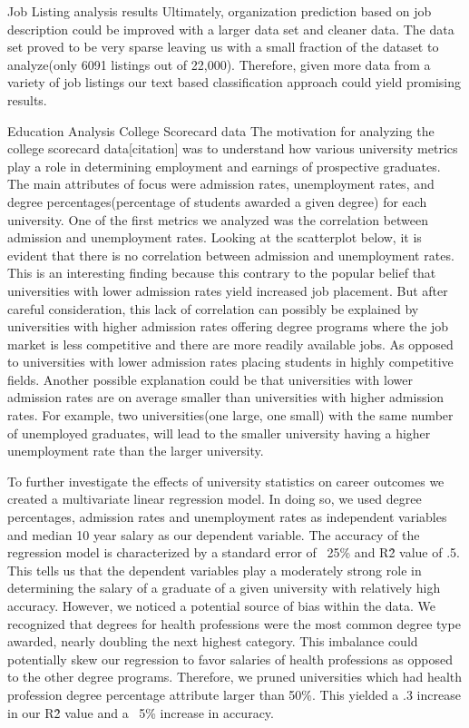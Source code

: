 Job Listing analysis results
Ultimately, organization prediction based on job description could be improved with a larger data set and cleaner data. The data set proved to be very sparse leaving us with a small fraction of the dataset to analyze(only 6091 listings out of 22,000). Therefore, given more data from a variety of job listings our text based classification approach could yield promising results.

Education Analysis
College Scorecard data
The motivation for analyzing the college scorecard data[citation] was to understand how various university metrics play a role in determining employment and earnings of prospective graduates. The main attributes of focus were admission rates, unemployment rates, and degree percentages(percentage of students awarded a given degree) for each university. One of the first metrics we analyzed was the correlation between admission and unemployment rates. Looking at the scatterplot below, it is evident that there is no correlation between admission and unemployment rates. This is an interesting finding because this contrary to the popular belief that universities with lower admission rates yield increased job placement. But after careful consideration, this lack of correlation can possibly be explained by universities with higher admission rates offering degree programs where the job market is less competitive and there are more readily available jobs. As opposed to universities with lower admission rates placing students in highly competitive fields. Another possible explanation could be that universities with lower admission rates are on average smaller than universities with higher admission rates. For example, two universities(one large, one small) with the same number of unemployed graduates, will lead to the smaller university having a higher unemployment rate than the larger university.

To further investigate the effects of university statistics on career outcomes we created a multivariate linear regression model.
In doing so, we used degree percentages, admission rates and unemployment rates as independent variables and median 10 year salary as our dependent variable.
The accuracy of the regression model is characterized by a standard error of ~25\% and R\^2 value of .5. This tells us that the dependent variables play a moderately strong role in determining the salary of a graduate of a given university with relatively high accuracy. However, we noticed a potential source of bias within the data. We recognized that degrees for health professions were the most common degree type awarded, nearly doubling the next highest category. This imbalance could potentially skew our regression to favor salaries of health professions as opposed to the other degree programs. Therefore, we pruned universities which had health profession degree percentage attribute larger than 50\%. This yielded a .3 increase in our R\^2 value and a ~5\% increase in accuracy.

